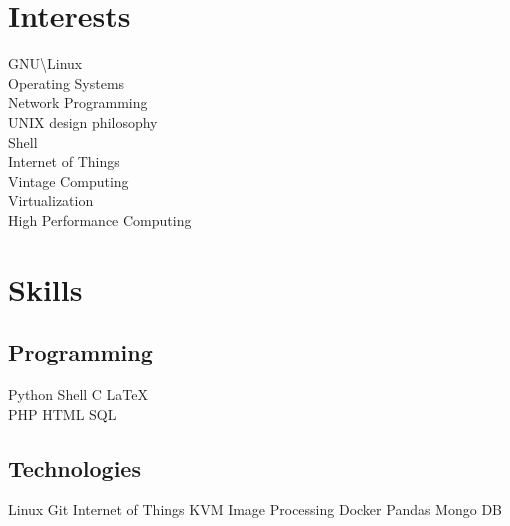 \documentclass[]{resume_karuvally_openfont}
\begin{document}
\begin{minipage}[t]{0.33\textwidth}
\section{Interests}
GNU\textbackslash Linux \\
Operating Systems \\
Network Programming \\
UNIX design philosophy \\
Shell \\
Internet of Things \\
Vintage Computing \\
Virtualization \\
High Performance Computing
\sectionsep


\section{Skills}
\subsection{Programming}
Python \textbullet{} Shell \textbullet{} C \textbullet{} \LaTeX \\
PHP \textbullet{} HTML \textbullet{} SQL
\sectionsep

\subsection{Technologies}
Linux \textbullet{} Git \textbullet{} Internet of Things \textbullet{} KVM
Image Processing \textbullet{} Docker \textbullet{} Pandas
Mongo DB
\sectionsep

%
%

\end{minipage} 
\hfill
\end{document}

